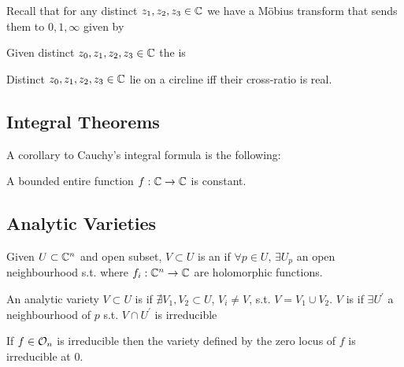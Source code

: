 \documentclass{article}
\begin{document}
Recall that for any distinct $z_1, z_2, z_3 \in \mathbb{C}$ we have a M\"obius transform that sends them to $0,1,\infty$ given by 
\begin{definition}
	Given distinct $z_0, z_1, z_2, z_3 \in \mathbb{C}$ the  is 
\end{definition}

\begin{prop}
	Distinct $z_0, z_1, z_2, z_3 \in \mathbb{C}$ lie on a circline iff their cross-ratio is real. 
\end{prop}

\subsection{Integral Theorems}

A corollary to Cauchy's integral formula is the following:

\begin{theorem}[Liouville]
	A bounded entire function $f:\mathbb{C} \to \mathbb{C}$ is constant. 
\end{theorem}
\subsection{Analytic Varieties}

\begin{definition}
	Given $U \subset \mathbb{C}^n$ and open subset, $V \subset U$ is an  if $\forall p \in U, \, \exists U_p$ an open neighbourhood s.t. 
where $f_i : \mathbb{C}^n \to \mathbb{C}$ are holomorphic functions. 
\end{definition}

\begin{definition}
	An analytic variety $V \subset U$ is  if $\nexists V_1, V_2 \subset U$, $V_i \neq V$, s.t. $V = V_1 \cup V_2$. $V$ is  if $\exists U^\prime$ a neighbourhood of $p$ s.t. $V\cap U^\prime$ is irreducible  
\end{definition}

\begin{prop}
	If $f \in \mathcal{O}_n$ is irreducible then the variety defined by the zero locus of $f$ is irreducible at 0.
\end{prop}
\end{document}
